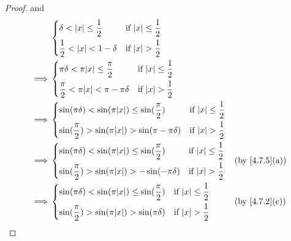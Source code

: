 \begin{proof}
  and
  \begin{align*}
             & \begin{dcases}
                 \delta < \abs{x} \leq \dfrac{1}{2}  & \text{if } \abs{x} \leq \dfrac{1}{2} \\
                 \dfrac{1}{2} < \abs{x} < 1 - \delta & \text{if } \abs{x} > \dfrac{1}{2}    \\
               \end{dcases}                               \\
    \implies & \begin{dcases}
                 \pi \delta < \pi \abs{x} \leq \dfrac{\pi}{2}    & \text{if } \abs{x} \leq \dfrac{1}{2} \\
                 \dfrac{\pi}{2} < \pi \abs{x} < \pi - \pi \delta & \text{if } \abs{x} > \dfrac{1}{2}    \\
               \end{dcases}                   \\
    \implies & \begin{dcases}
                 \sin(\pi \delta) < \sin(\pi \abs{x}) \leq \sin(\dfrac{\pi}{2})    & \text{if } \abs{x} \leq \dfrac{1}{2} \\
                 \sin(\dfrac{\pi}{2}) > \sin(\pi \abs{x}) > \sin(\pi - \pi \delta) & \text{if } \abs{x} > \dfrac{1}{2}    \\
               \end{dcases} \\
    \implies & \begin{dcases}
                 \sin(\pi \delta) < \sin(\pi \abs{x}) \leq \sin(\dfrac{\pi}{2}) & \text{if } \abs{x} \leq \dfrac{1}{2} \\
                 \sin(\dfrac{\pi}{2}) > \sin(\pi \abs{x}) > -\sin(-\pi \delta)  & \text{if } \abs{x} > \dfrac{1}{2}    \\
               \end{dcases}    &  & \text{(by \cref{4.7.5}(a))}    \\
    \implies & \begin{dcases}
                 \sin(\pi \delta) < \sin(\pi \abs{x}) \leq \sin(\dfrac{\pi}{2}) & \text{if } \abs{x} \leq \dfrac{1}{2} \\
                 \sin(\dfrac{\pi}{2}) > \sin(\pi \abs{x}) > \sin(\pi \delta)    & \text{if } \abs{x} > \dfrac{1}{2}    \\
               \end{dcases}    &  & \text{(by \cref{4.7.2}(c))}    \\

\end{align*}
\end{proof}
